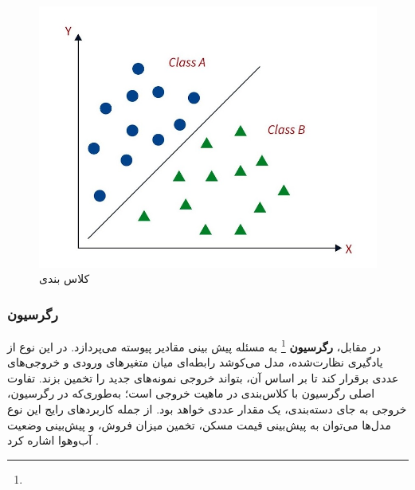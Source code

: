 \begin{figure}[h]
	\centering
	\begin{minipage}[b]{0.7\textwidth}
		\centering
		\includegraphics[width=\textwidth]{transformer_images/classification_small.jpg}
		\caption{کلاس بندی}
		\label{fig:classification}
	\end{minipage}
	\hfill
\end{figure}



\subsubsection{رگرسیون}

در مقابل، \textbf{رگرسیون} \footnote{}  به مسئله پیش‌ بینی مقادیر پیوسته می‌پردازد. در این نوع از یادگیری نظارت‌شده، مدل می‌کوشد رابطه‌ای میان متغیرهای ورودی و خروجی‌های عددی برقرار کند تا بر اساس آن، بتواند خروجی نمونه‌های جدید را تخمین بزند. تفاوت اصلی رگرسیون با کلاس‌بندی در ماهیت خروجی است؛ به‌طوری‌که در رگرسیون، خروجی به جای دسته‌بندی، یک مقدار عددی خواهد بود. از جمله کاربردهای رایج این نوع مدل‌ها می‌توان به پیش‌بینی قیمت مسکن، تخمین میزان فروش، و پیش‌بینی وضعیت آب‌وهوا اشاره کرد \cite{montgomery2021introduction}.


